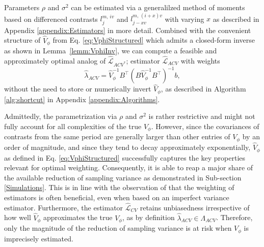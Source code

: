 \documentclass[11pt,dvipsnames]{article}
\begin{document}
Parameters $\rho$ and $\sigma^{2}$ can be estimated via a generalilzed method of moments based on differenced contrasts $l_{j}^{m,\,iv }$ and $l_{j-xv}^{m,\,(i+x)v }$ with varying $x$ as described in Appendix \ref{appendix:Estimators} in more detail.
Combined with the convenient structure of $ \widehat{V}_{\phi} $ from Eq. \ref{eq:VphiStructured} which admits a closed-form inverse as shown in Lemma~\ref{lemm:VphiInv}, we can compute a feasible and approximately optimal analog of $\widehat{\mathcal{L}}_{ACV^{*}} $; estimator $\widehat{\mathcal{L}}_{ACV} $ with weights 
\begin{equation}
\widehat{\lambda}_{ACV}=\widehat{V}_{\phi}^{-1}B^{\top}\left( B \widehat{V}_{\phi}^{-1} B^{\top} \right)^{-1} b,
\end{equation}
without the need to store or numerically invert $ \widehat{V}_{\phi} $, as described in Algorithm \ref{alg:shortcut} in Appendix  \ref{appendix:Algorithms}.


Admittedly, the parametrization via $ \rho $ and $ \sigma^{2} $ is rather restrictive and might not fully account for all complexities of the true $ V_{\phi} $. However, since the covariances of contrasts from the same period are generally larger than other entries of $ V_{\phi} $ by an order of magnitude, and since they tend to decay approximately exponentially, $ \widehat{V}_{\phi} $ as defined in Eq. \ref{eq:VphiStructured} successfully captures the key properties relevant for optimal weighting. Consequently, it is able to reap a major share of the available reduction of sampling variance as demonstrated in Sub-section \ref{Simulations}. This is in line with the observation of \citet{lavancierGeneralProcedureCombine2016} that the weighting of estimators is often beneficial, even when based on an imperfect variance estimator. Furthermore, the estimator $ \widehat{\mathcal{L}}_{CV}  $ retains unbiasedness irrespective of how well $ \widehat{V}_{\phi} $ approximates the true $V_{\phi} $, as by definition $ \widehat{\lambda}_{ACV} \in \Lambda_{ACV}$. Therefore, only the magnitude of the reduction of sampling variance is at risk when $V_{\phi} $ is imprecisely estimated.
\end{document}
